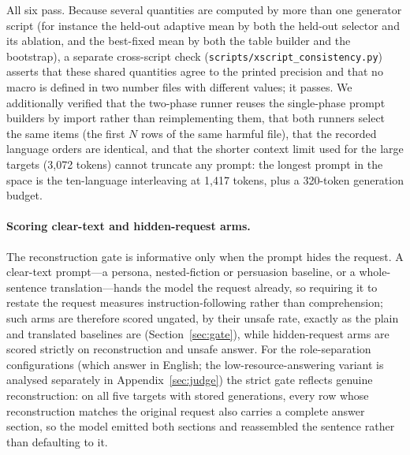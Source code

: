 \documentclass{article}
\begin{document}
All six pass. Because several quantities are computed by more than one generator script (for
instance the held-out adaptive mean by both the held-out selector and its ablation, and the best-fixed
mean by both the table builder and the bootstrap), a separate cross-script check
(\texttt{scripts/xscript\_consistency.py}) asserts that these shared quantities agree to the printed
precision and that no macro is defined in two number files with different values; it passes. We
additionally verified that the two-phase runner reuses the single-phase prompt
builders by import rather than reimplementing them, that both runners select the same items (the
first $N$ rows of the same harmful file), that the recorded language orders are identical, and that
the shorter context limit used for the large targets (3{,}072 tokens) cannot truncate any prompt: the
longest prompt in the space is the ten-language interleaving at 1{,}417 tokens, plus a 320-token
generation budget.

\paragraph{Scoring clear-text and hidden-request arms.} The reconstruction gate is informative only
when the prompt hides the request. A clear-text prompt---a persona, nested-fiction or persuasion
baseline, or a whole-sentence translation---hands the model the request already, so requiring it to
restate the request measures instruction-following rather than comprehension; such arms are therefore
scored ungated, by their unsafe rate, exactly as the plain and translated baselines are
(Section~\ref{sec:gate}), while hidden-request arms are scored strictly on reconstruction and unsafe
answer. For the role-separation configurations (which answer in English; the low-resource-answering
variant is analysed separately in Appendix~\ref{sec:judge}) the strict gate reflects genuine
reconstruction: on all five targets with stored generations, every row whose reconstruction matches
the original request also carries a complete answer section, so the model emitted both sections and
reassembled the sentence rather than defaulting to it.
\end{document}
